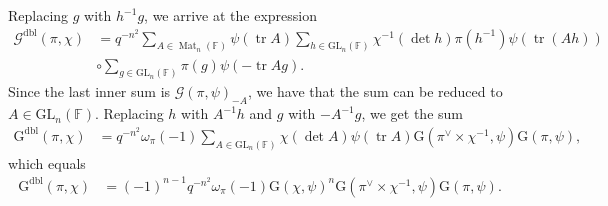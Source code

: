 \documentclass[12pt, reqno]{amsart}
\theoremstyle{definition}
\theoremstyle{definition}
\theoremstyle{definition}
\newcommand{\fieldCharacter}{\psi}
\newcommand{\centralCharacter}[1]{\omega_{#1}}
\newcommand{\Contragradient}[1]{#1^{\vee}}
\newcommand{\trace}{\operatorname{tr}}
\newcommand{\GL}{\mathrm{GL}}
\newcommand{\finiteField}{\mathbb{F}}
\newcommand{\squareMatrix}{\operatorname{Mat}}
\newcommand{\GaussSum}[2]{\mathcal{G}\left(#1, #2\right)}
\newcommand{\dblGaussSum}[2]{\mathcal{G}^{\mathrm{dbl}}\left(#1, #2\right)}
\newcommand{\GaussSumScalar}[2]{\mathrm{G}\left(#1, #2\right)}
\newcommand{\dblGaussSumScalar}[2]{\mathrm{G}^{\mathrm{dbl}}\left(#1, #2\right)}
\begin{document}
Replacing $g$ with $h^{-1} g$, we arrive at the expression
\begin{align*}
	\dblGaussSum{\pi}{\chi} &= q^{-n^2} \sum_{A \in \squareMatrix_n\left(\finiteField\right)} \fieldCharacter\left(\trace A\right) \sum_{h \in \GL_n\left(\finiteField\right)} \chi^{-1}\left(\det h\right) \pi\left(h^{-1}\right) \fieldCharacter\left(\trace\left(Ah\right)\right)\\
	& \circ \sum_{g \in \GL_n\left(\finiteField\right)} \pi\left(g\right) \fieldCharacter\left(-\trace Ag\right).
\end{align*}
Since the last inner sum is $\GaussSum{\pi}{\fieldCharacter}_{-A}$, we have that the sum can be reduced to $A \in \GL_n\left(\finiteField\right)$. Replacing $h$ with $A^{-1} h$ and $g$ with $-A^{-1} g$, we get the sum
\begin{align*}
	\dblGaussSumScalar{\pi}{\chi} &= q^{-n^2} \centralCharacter{\pi}\left(-1\right) \sum_{A \in \GL_n\left(\finiteField\right)} \chi\left(\det A\right) \fieldCharacter\left(\trace A\right) \GaussSumScalar{\Contragradient{\pi} \times \chi^{-1}}{\fieldCharacter} \GaussSumScalar{\pi}{\fieldCharacter},
\end{align*}
which equals
\begin{align*}
	\dblGaussSumScalar{\pi}{\chi} &= \left(-1\right)^{n-1} q^{-n^2} \centralCharacter{\pi}\left(-1\right) \GaussSumScalar{\chi}{\fieldCharacter}^n \GaussSumScalar{\Contragradient{\pi} \times \chi^{-1}}{\fieldCharacter} \GaussSumScalar{\pi}{\fieldCharacter}.
\end{align*}



\end{document}
